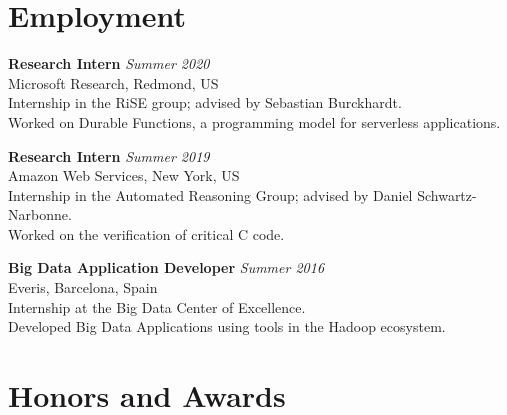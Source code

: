 \documentclass[margin]{res}
\begin{document}
\begin{resume}




\section{Employment}

\textbf{Research Intern}  \hfill {\em Summer 2020} \\
Microsoft Research, Redmond, US \\
Internship in the RiSE group; advised by Sebastian Burckhardt. \\
Worked on Durable Functions, a programming model for serverless applications.

\textbf{Research Intern}  \hfill {\em Summer 2019} \\
Amazon Web Services, New York, US \\
Internship in the Automated Reasoning Group; advised by Daniel Schwartz-Narbonne. \\
Worked on the verification of critical C code.


\textbf{Big Data Application Developer}  \hfill {\em Summer 2016} \\
Everis, Barcelona, Spain \\
Internship at the Big Data Center of Excellence. \\
Developed Big Data Applications using tools in the Hadoop ecosystem.

\section{Honors and Awards}


\end{resume}
\end{document}
